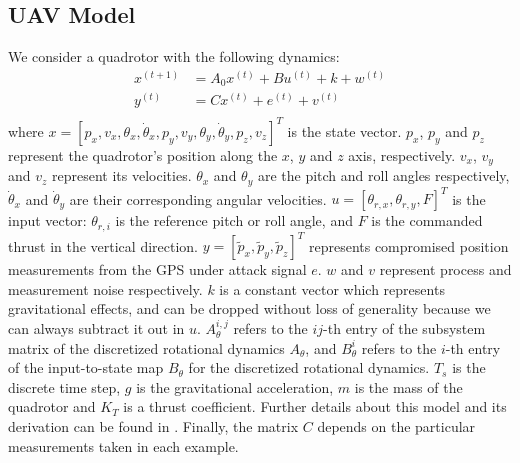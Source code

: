\documentclass[../../thesis.tex]{subfiles}
\begin{document}
\subsection{UAV Model}

We consider a quadrotor with the following dynamics:
\begin{equation}
\begin{aligned}
x^{(t+1)} &= A_0 x^{(t)} + B u^{(t)}  + k + w^{(t)} \\
y^{(t)} &= C x^{(t)} + e^{(t)} + v^{(t)} \\
\end{aligned}
\end{equation}
where $x = [p_x, v_x, \theta_x, \dot \theta_x, p_y, v_y, \theta_y, \dot\theta_y, p_z, v_z]^T$ is the state vector. $p_x$, $p_y$ and $p_z$ represent the quadrotor's position along the $x$, $y$ and $z$ axis, respectively. $v_x$, $v_y$ and $v_z$ represent its velocities. $\theta_x$ and $\theta_y$ are the pitch and roll angles respectively, $\dot \theta_x$ and $\dot \theta_y$ are their corresponding angular velocities. %
$u = [\theta_{r,x}, \theta_{r,y}, F]^T$ is the input vector: $\theta_{r,i}$ is the reference pitch or roll angle, and $F$ is the commanded thrust in the vertical direction. $y = [\tilde{p}_x, \tilde{p}_y, \tilde{p}_z]^T$ %
represents compromised position measurements from the GPS under attack signal $e$. $w$ and $v$ represent process and measurement noise respectively. $k$ is a constant vector which represents gravitational effects, and can be dropped without loss of generality because we can always subtract it out in $u$. $A_\theta^{i,j}$ refers to the $ij$-th entry of the subsystem matrix of the discretized rotational dynamics $A_\theta$, and $B_\theta^i$ refers to the $i$-th entry of the input-to-state map $B_\theta$ for the discretized rotational dynamics. $T_s$ is the discrete time step, $g$ is the gravitational acceleration, $m$ is the mass of the quadrotor and $K_T$ is a thrust coefficient. Further details about this model and its derivation can be found in \cite{Bouffard}. Finally, the matrix $C$ depends on the particular measurements taken in each example.
\end{document}
